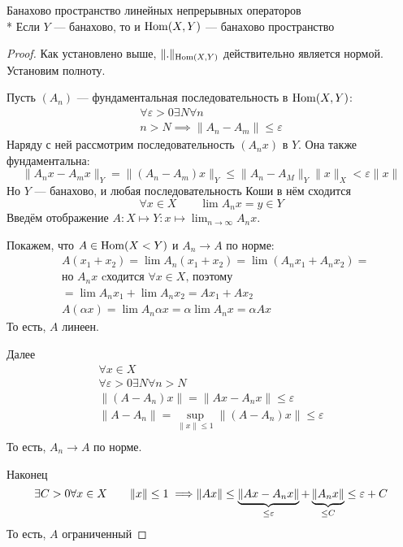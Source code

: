 \begin{thm}{Банахово пространство линейных непрерывных операторов}\\*
  Если $Y$ --- банахово, то и $\mathrm{Hom}(X, Y)$ --- банахово пространство
\end{thm}
\begin{proof}
  Как установлено выше, $\|.\|_{\mathrm{Hom}(X,Y)}$ действительно является нормой.
  Установим полноту.
  \par{}
  Пусть $(A_n)$ --- фундаментальная последовательность в $\mathrm{Hom}(X,Y)$:
  \begin{align*}
    \forall\varepsilon>0 \exists N \forall n\\
    n>N \implies \|A_n - A_m\| \leq \varepsilon
  \end{align*}
  Наряду с ней рассмотрим последовательность $(A_n x)$ в $Y$.
  Она также фундаментальна:
  \begin{equation*}
    \|A_n x - A_m x\|_Y = \|(A_n - A_m) x\|_Y \leq \|A_n - A_M\|_Y\|x\|_X < \varepsilon\|x\|
  \end{equation*}
  Но $Y$ --- банахово, и любая последовательность Коши в нём сходится
  \begin{equation*}
    \forall x\in X \qquad \lim A_n x = y\in Y
  \end{equation*}
  Введём отображение
  $A:X\mapsto Y:x\mapsto\lim_{n\to\infty} A_n x$.

  \par{}
  Покажем, что $A\in\mathrm{Hom}(X<Y)$ и $A_n\to A$ по норме:
  \begin{align*}
    &A (x_1 + x_2) = \lim A_n (x_1 + x_2) = \lim (A_n x_1 + A_n x_2) = \\
    &\text{но } A_n x \text{ cходится } \forall x\in X \text{, поэтому } \\
    &= \lim A_n x_1 + \lim A_n x_2 = A x_1 + A x_2 \\
    &A (\alpha x) = \lim A_n \alpha x = \alpha \lim A_n x = \alpha A x
  \end{align*}
  То есть, $A$ линеен.

  Далее
  \begin{align*}
    & \forall x\in X &\\
    & \forall \varepsilon>0 \exists N \forall n>N \\
    & \|(A - A_n) x\| = \|A x - A_n x\| \leq \varepsilon \\
    & \|A - A_n\| = \sup_{\|x\|\leq 1} \|(A - A_n)x\| \leq \varepsilon \\
  \end{align*}
  То есть, $A_n\to A$ по норме.

  Наконец
  \begin{equation*}
    \exists C>0 \\
    \forall x\in X \qquad \|x\|\leq 1 \implies \\
    \|A x\| \leq
     \underbrace{\|A x - A_n x\|}_{\leq \varepsilon}
     + \underbrace{\|A_n x\|}_{\leq C} \leq \varepsilon+C
  \end{equation*}
  То есть, $A$ ограниченный
\end{proof}
